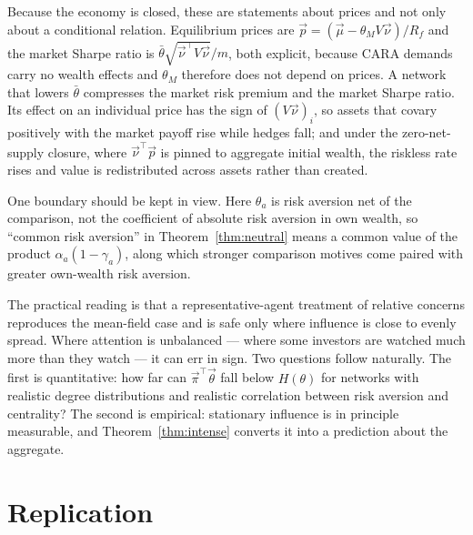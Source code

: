 \documentclass[12pt]{article}
\theoremstyle{definition}
\theoremstyle{remark}
\newcommand{\bth}{\bar\theta}
\begin{document}
Because the economy is closed, these are statements about prices and not only
about a conditional relation. Equilibrium prices are
$\vec p=(\vec\mu-\theta_MV\vec\nu)/R_f$ and the market Sharpe ratio is
$\bth\sqrt{\vec\nu^{\top}V\vec\nu}/m$, both explicit, because CARA demands carry
no wealth effects and $\theta_M$ therefore does not depend on prices. A network that lowers $\bth$ compresses the market risk premium and the market
Sharpe ratio. Its effect on an individual price has the sign of
$(V\vec\nu)_i$, so assets that covary positively with the market payoff rise
while hedges fall; and under the zero-net-supply closure, where
$\vec\nu^{\top}\vec p$ is pinned to aggregate initial wealth, the riskless rate
rises and value is redistributed across assets rather than created.

One boundary should be kept in view. Here $\theta_a$ is risk aversion net of the
comparison, not the coefficient of absolute risk aversion in own wealth, so
``common risk aversion'' in Theorem~\ref{thm:neutral} means a common value of
the product $\alpha_a(1-\gamma_a)$, along which stronger comparison motives come
paired with greater own-wealth risk aversion.

The practical reading is that a representative-agent treatment of relative
concerns reproduces the mean-field case and is safe only where influence is
close to evenly spread. Where attention is unbalanced --- where some investors
are watched much more than they watch --- it can err in sign. Two questions
follow naturally. The first is quantitative: how far can
$\vec\pi^{\top}\vec\theta$ fall below $H(\theta)$ for networks with realistic
degree distributions and realistic correlation between risk aversion and
centrality? The second is empirical: stationary influence is in principle
measurable, and Theorem~\ref{thm:intense} converts it into a prediction about
the aggregate.

\section*{Replication}
\label{sec:replication}
\end{document}

